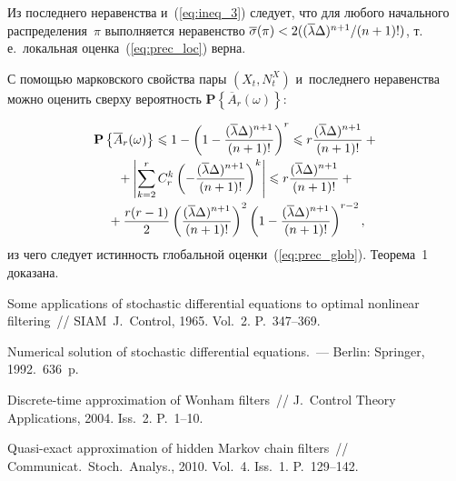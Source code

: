 \begin{multicols}{2}
{  \vspace*{-2pt}
  
  \noindent
 Из последнего неравенства и~(\ref{eq:ineq_3}) следует, что  для любого 
 начального распределения~$\pi$ выполняется неравенство $\overline{\sigma}(\pi)  
 \hm< 2({(\overline{\lambda}\Delta)^{n+1}}/{(n+1)!})$, т.\,е.\ 
 локальная оценка~(\ref{eq:prec_loc}) верна.
 
 С помощью марковского свойства пары $(X_t, N^X_t)$ и~последнего 
 неравенства можно оценить сверху вероятность 
 $\mathbf{P}\left\{\overline{A}_r(\omega)\right\}$:
 
  \vspace*{-2pt}
 
 \noindent
 \begin{multline*}
 \mathbf{P}\left\{\overline{A}_r(\omega)\right\} \leqslant 1 - \left(
 1- \displaystyle\frac{\displaystyle (\overline{\lambda}\Delta)^{n+1}\mathstrut}{\displaystyle (n+1)!\mathstrut}
 \right)^r \leqslant r \displaystyle\frac{\displaystyle (\overline{\lambda}\Delta)^{n+1}\mathstrut}{\displaystyle (n+1)!\mathstrut} + {}\\[-1pt]
 {}+\left|
 \sum\limits_{k=2}^r C_r^k \left(-\displaystyle\frac{\displaystyle (\overline{\lambda}\Delta)^{n+1}\mathstrut}{\displaystyle (n+1)!\mathstrut}
 \right)^k
 \right| \leqslant
 r \displaystyle\frac{\displaystyle (\overline{\lambda}\Delta)^{n+1}\mathstrut}{\displaystyle (n+1)!\mathstrut} +{}\\[-1pt]
 {}+\displaystyle\frac{\displaystyle r(r-1)\mathstrut}{\displaystyle 2\mathstrut}
 \left(
 \displaystyle\frac{\displaystyle (\overline{\lambda}\Delta)^{n+1}\mathstrut}{\displaystyle (n+1)!\mathstrut}
 \right)^2
 \left(
 1-\displaystyle\frac{\displaystyle (\overline{\lambda}\Delta)^{n+1}\mathstrut}{\displaystyle (n+1)!\mathstrut}
 \right)^{r-2},
 \end{multline*} 
 из чего следует истинность глобальной оценки~(\ref{eq:prec_glob}).
Теорема~1 доказана.

}


{\small\frenchspacing
 {%
 \begin{thebibliography}{99}

Some applications of stochastic differential equations to optimal
  nonlinear filtering~//
SIAM~J.~Control, 1965. Vol.~2. P.~347--369. 

 Numerical solution of stochastic
differential equations.~--- Berlin: Springer, 1992.~636~p.

Discrete-time approximation of Wonham filters~//
J.~Control Theory Applications, 2004. Iss.~2. P.~1--10.

Quasi-exact approximation of hidden Markov chain filters~//
Communicat.~Stoch.~Analys., 2010. Vol.~4. Iss.~1. P.~129--142.


\end{thebibliography}}}
\end{multicols}
